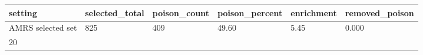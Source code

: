 \begin{tabular}{llllll}
\toprule
setting & selected\_total & poison\_count & poison\_percent & enrichment & removed\_poison \\
\midrule
AMRS selected set & 825 & 409 & 49.60 & 5.45 & 0.000 \\
20%
\bottomrule
\end{tabular}
